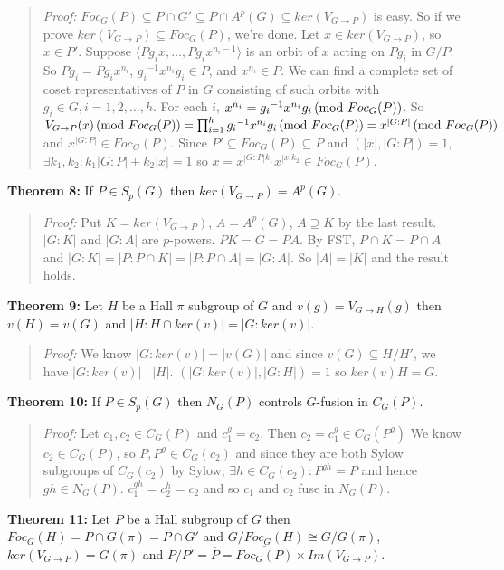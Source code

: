 \begin{quote}
\emph{Proof:}  
$Foc_G(P) \subseteq  P \cap G' \subseteq  P \cap A^p(G)  \subseteq ker(V_{G \rightarrow P})$ is
easy.  So if we prove
$ker(V_{G \rightarrow P}) \subseteq Foc_G(P)$, we're done.  Let $x \in ker(V_{G \rightarrow P})$, so $x \in P'$.
Suppose $\langle Pg_i x, \ldots , P g_i x^{n_i - 1} \rangle$ is an orbit of $x$ acting on $Pg_i$ in $G/P$. So $Pg_i = Pg_i x^{n_i}$,
${g_i}^{-1} x^{n_i} g_i \in P$, and $x^{n_i} \in P$.  
We can find a complete set of coset representatives of $P$ in $G$ consisting of such orbits with $g_i \in G, i = 1,2, \ldots, h$.
For each $i$, $x^{n_i} = {g_i}^{-1} x^{n_i} g_i \thinspace \textnormal{(mod } Foc_G(P) \textnormal{)}$.  So 
$V_{G \rightarrow P}(x) \thinspace \textnormal{(mod } Foc_G(P) \textnormal{)} = \prod_{i=1}^h {g_i}^{-1} x^{n_i} g_i \thinspace \textnormal{(mod } Foc_G(P) \textnormal{)} = x^{|G:P|} \thinspace \textnormal{(mod } Foc_G(P) \textnormal{)}$
and  $x^{|G:P|} \in Foc_G(P)$.  Since $P' \subseteq Foc_G(P) \subseteq P$ and $(|x|, |G:P|) =1$, $\exists k_1, k_2: k_1|G:P| + k_2|x| = 1$
so $x = x^{|G:P| k_1} x^{|x| k_2} \in Foc_G(P)$.
\end{quote}
{\bf Theorem 8:}  
If $P \in S_p(G)$ then $ker(V_{G \rightarrow P})= A^p(G)$.
\begin{quote}
\emph{Proof:}  
Put $K= ker(V_{G \rightarrow P})$, $A= A^p(G)$,  $A \supseteq K$ by the last result.
$|G:K|$ and $|G:A|$ are $p$-powers.  $PK=G=PA$.  By FST, $P \cap K = P \cap A$ and
$|G:K|= |P:P \cap K|= |P: P \cap A|= |G:A|$.  So $|A|= |K|$ and the result holds.
\end{quote}
{\bf Theorem 9:}  
Let $H$ be a Hall $\pi$ subgroup of $G$ and $v(g)= V_{G \rightarrow H}(g)$ then
$v(H)=v(G)$ and $|H: H \cap ker(v)|= |G:ker(v)|$.
\begin{quote}
\emph{Proof:}  
We know $|G:ker(v)| = |v(G)|$ and since
$v(G) \subseteq H/H'$, we have $|G:ker(v)| \mid |H|$.  $(|G:ker(v)|, |G:H|)=1$ so
$ker(v)H=G$.
\end{quote}
{\bf Theorem 10:}  
If $P \in S_p(G)$ then $N_G(P)$ controls $G$-fusion in $C_G(P)$.
\begin{quote}
\emph{Proof:}  
Let $c_1 , c_2 \in C_G(P)$ and $c_1^g=c_2$.  Then $c_2 = c_1^g \in C_G(P^g)$
We know $c_2 \in C_G(P)$, so $P, P^g \in C_G(c_2)$ and since they are both
Sylow subgroups of $C_G(c_2)$ by Sylow, $\exists h \in C_G(c_2): P^{gh}=P$ and
hence $gh \in N_G(P)$.  $c_1^{gh}= c_2^h= c_2$ and so $c_1$ and $c_2$ fuse in $N_G(P)$.
\end{quote}
{\bf Theorem 11:}  Let  $P$ be a Hall subgroup of $G$ then $Foc_G(H) = P \cap G(\pi)=P \cap G'$ and
$G/Foc_G(H) \cong G/G(\pi)$, $ker(V_{G \rightarrow P}) = G(\pi)$ and $P/P' = {\overline P} = {\overline {Foc_G(P)}} \times Im(V_{G \rightarrow P})$.
